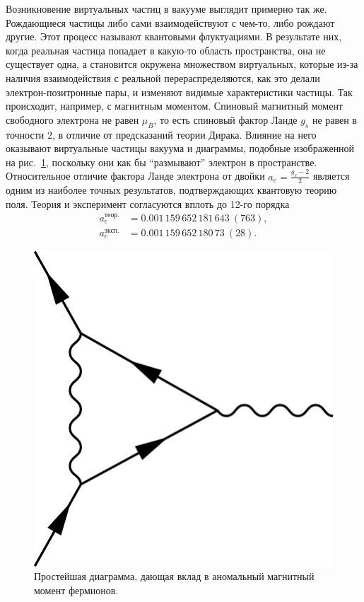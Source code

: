 \documentclass[a4paper, 12pt]{article}
\begin{document}
Возникновение виртуальных частиц в вакууме выглядит примерно так же. 
Рождающиеся частицы либо сами взаимодействуют с чем-то, либо рождают другие. 
Этот процесс называют квантовыми флуктуациями. 
В результате них, когда реальная частица попадает в какую-то область пространства, она не существует одна, а становится окружена множеством виртуальных, которые из-за наличия взаимодействия с реальной перераспределяются, как это делали электрон-позитронные пары, и изменяют видимые характеристики частицы. 
Так происходит, например, с магнитным моментом. 
Спиновый магнитный момент свободного электрона не равен $\mu_B$, то есть спиновый фактор Ланде $g_s$ не равен в точности $2$, в отличие от предсказаний теории Дирака. Влияние на него оказывают виртуальные частицы вакуума и диаграммы, подобные изображенной на рис.~\ref{fig:g_s}, поскольку они как бы ``размывают'' электрон в пространстве. 
Относительное отличие фактора Ланде электрона от двойки $a_e = \frac{g_s - 2}{2}$ является одним из наиболее точных результатов, подтверждающих квантовую теорию поля. 
Теория и эксперимент согласуются вплоть до 12-го порядка~\cite{electron.g-2.exp, electron.g-2.theory}
\begin{align*}
a_e^\text{теор.} &= 0.001\,159\,652\,181\,643\ (763), \\
a_e^\text{эксп.} &= 0.001\,159\,652\,180\,73\ (28). 
\end{align*}

\begin{figure}
\includegraphics[width=.25\linewidth]{figs/Magnetic-anom-e}
\caption{Простейшая диаграмма, дающая вклад в аномальный магнитный момент фермионов.}
\label{fig:g_s}
\end{figure}
\end{document}
